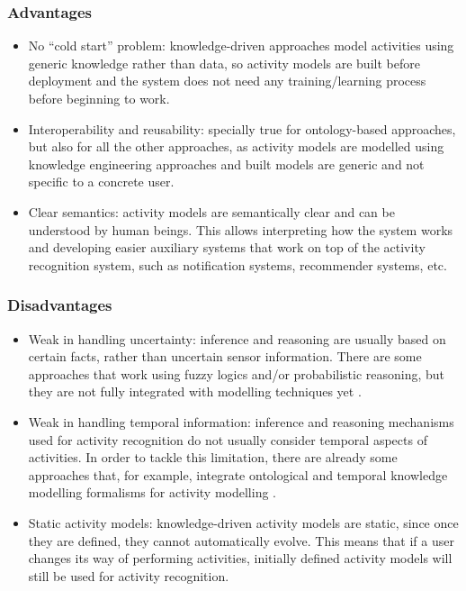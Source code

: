 \subsubsection*{Advantages}
\begin{itemize}
 \item No ``cold start'' problem: knowledge-driven approaches model activities using generic knowledge rather than data, so activity models are built before deployment and the system does not need any training/learning process before beginning to work.
 \item Interoperability and reusability: specially true for ontology-based approaches, but also for all the other approaches, as activity models are modelled using knowledge engineering approaches and built models are generic and not specific to a concrete user. 
 \item Clear semantics: activity models are semantically clear and can be understood by human beings. This allows interpreting how the system works and developing easier auxiliary systems that work on top of the activity recognition system, such as notification systems, recommender systems, etc. 
\end{itemize}

\subsubsection*{Disadvantages}
\begin{itemize}
 \item Weak in handling uncertainty: inference and reasoning are usually based on certain facts, rather than uncertain sensor information. There are some approaches that work using fuzzy logics and/or probabilistic reasoning, but they are not fully integrated with modelling techniques yet \cite{Helaoui2013}.
 \item Weak in handling temporal information: inference and reasoning mechanisms used for activity recognition do not usually consider temporal aspects of activities. In order to tackle this limitation, there are already some approaches that, for example, integrate ontological and temporal knowledge modelling formalisms for activity modelling \cite{Okeyo2012}. 
 \item Static activity models: knowledge-driven activity models are static, since once they are defined, they cannot automatically evolve. This means that if a user changes its way of performing activities, initially defined activity models will still be used for activity recognition.
\end{itemize}


